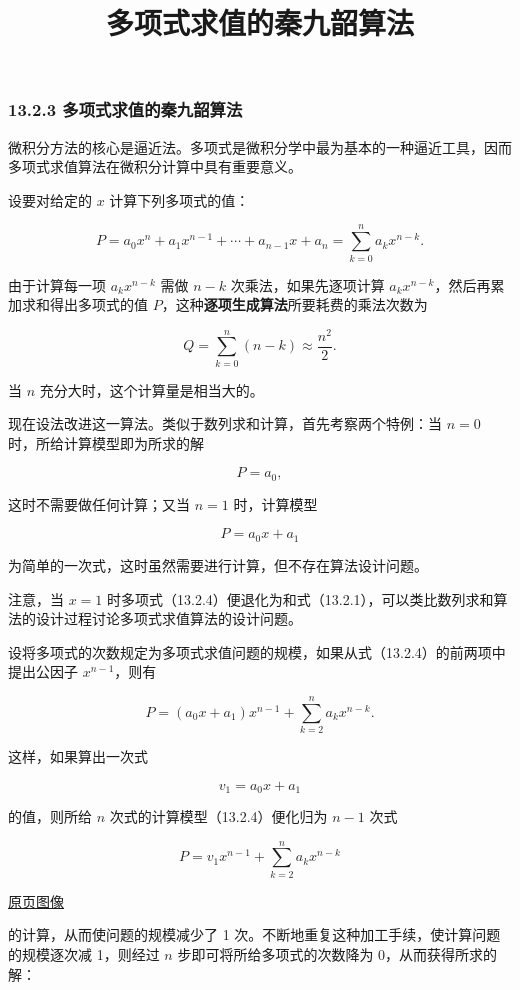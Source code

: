 \documentclass[
  10pt,
  fontset=fandol]{ctexart}
\title{多项式求值的秦九韶算法}
\author{}
\date{}
\begin{document}
\maketitle

\subsubsection{13.2.3 多项式求值的秦九韶算法}\label{ux591aux9879ux5f0fux6c42ux503cux7684ux79e6ux4e5dux97f6ux7b97ux6cd5}

微积分方法的核心是逼近法。多项式是微积分学中最为基本的一种逼近工具，因而多项式求值算法在微积分计算中具有重要意义。

设要对给定的 \(x\) 计算下列多项式的值：

\[
P=a_0x^n+a_1x^{n-1}+\cdots+a_{n-1}x+a_n
=\sum_{k=0}^{n}a_kx^{n-k}.
\tag{13.2.4}
\]

由于计算每一项 \(a_kx^{n-k}\) 需做 \(n-k\) 次乘法，如果先逐项计算 \(a_kx^{n-k}\)，然后再累加求和得出多项式的值 \(P\)，这种\textbf{逐项生成算法}所要耗费的乘法次数为

\[
Q=\sum_{k=0}^{n}(n-k)\approx\frac{n^2}{2}.
\]

当 \(n\) 充分大时，这个计算量是相当大的。

现在设法改进这一算法。类似于数列求和计算，首先考察两个特例：当 \(n=0\) 时，所给计算模型即为所求的解

\[
P=a_0,
\]

这时不需要做任何计算；又当 \(n=1\) 时，计算模型

\[
P=a_0x+a_1
\]

为简单的一次式，这时虽然需要进行计算，但不存在算法设计问题。

注意，当 \(x=1\) 时多项式（13.2.4）便退化为和式（13.2.1），可以类比数列求和算法的设计过程讨论多项式求值算法的设计问题。

设将多项式的次数规定为多项式求值问题的规模，如果从式（13.2.4）的前两项中提出公因子 \(x^{n-1}\)，则有

\[
P=(a_0x+a_1)x^{n-1}+\sum_{k=2}^{n}a_kx^{n-k}.
\]

这样，如果算出一次式

\[
v_1=a_0x+a_1
\]

的值，则所给 \(n\) 次式的计算模型（13.2.4）便化归为 \(n-1\) 次式

\[
P=v_1x^{n-1}+\sum_{k=2}^{n}a_kx^{n-k}
\]

\href{../../source-images/pdf-311.jpeg}{原页图像}

的计算，从而使问题的规模减少了 1 次。不断地重复这种加工手续，使计算问题的规模逐次减 1，则经过 \(n\) 步即可将所给多项式的次数降为 0，从而获得所求的解：
\end{document}
